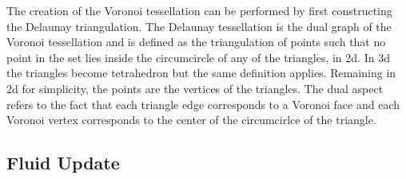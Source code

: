 The creation of the Voronoi tessellation can be performed by first constructing
the Delaunay triangulation. The Delaunay tessellation is the dual graph of the
Voronoi tessellation and is defined as the triangulation of points such that
no point in the set lies inside the circumcircle of any of the triangles, in
2d. In 3d the triangles become tetrahedron but the same definition applies.
Remaining in 2d for simplicity, the points are the vertices of the triangles.
The dual aspect refers to the fact that each triangle edge corresponds to a
Voronoi face and each Voronoi vertex corresponds to the center of the
circumcirlce of the triangle. 

\subsection{Fluid Update}
